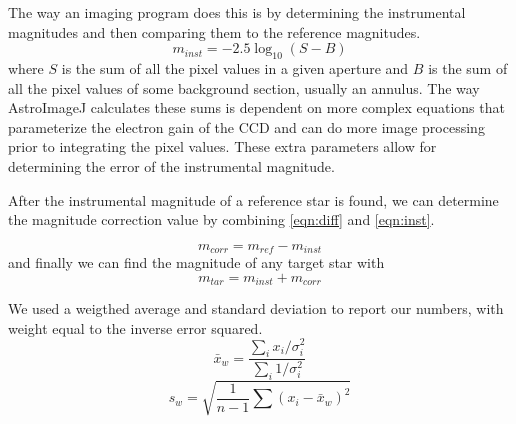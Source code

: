 \documentclass[%
aip,
jmp,
reprint,
floatfix
]{revtex4-1}
\begin{document}
	The way an imaging program does this is by determining the instrumental magnitudes and then comparing them to the reference magnitudes. 
	\begin{equation}
	 	m_{inst} = -2.5 \log_{10}(S-B)
	 	\label{eqn:inst}
	\end{equation}
	where $S$ is the sum of all the pixel values in a given aperture and $B$ is the sum of all the pixel values of some background section, usually an annulus. The way AstroImageJ calculates these sums is dependent on more complex equations that parameterize the electron gain of the CCD and can do more image processing prior to integrating the pixel values. These extra parameters allow for determining the error of the instrumental magnitude.
	
	After the instrumental magnitude of a reference star is found, we can determine the magnitude correction value by combining \autoref{eqn:diff} and \autoref{eqn:inst}.
	
	\begin{equation}
		m_{corr} = m_{ref} - m_{inst}
		\label{eqn:corrected}
	\end{equation}
	and finally we can find the magnitude of any target star with 
	\begin{equation}
		m_{tar} = m_{inst} + m_{corr}
		\label{eqn:final}
	\end{equation}
	
	We used a weigthed average and standard deviation to report our numbers, with weight equal to the inverse error squared.
	\begin{equation}
	 	\bar{x}_w = \frac{\sum_i{x_i/\sigma_i^2}}{\sum_i{1/\sigma_i^2}}
	 	\label{eqn:wa}
	\end{equation}
	\begin{equation}
	s_w = \sqrt{\frac{1}{n-1} \sum{(x_i -\bar{x}_w)^2}}
	\label{eqn:ws}
	\end{equation}
	


\end{document}

